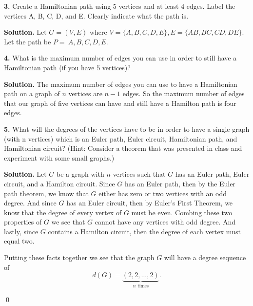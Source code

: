 \documentclass{article}
\begin{document}
\newpage
\textbf{3.}  Create a Hamiltonian path using 5 vertices and at least 4 edges. Label the vertices A, B, C, D, and E. Clearly indicate what the path is.

\vspace{2mm}
\textbf{Solution.} Let \(G= (V,E)\) where \( V=\{A,B,C,D,E\}, E=\{AB, BC, CD, DE\}\). Let the path be \(P= ~ A,B,C,D,E\). 
\begin{center}
\end{center}



\vspace{4mm}
\textbf{4.} What is the maximum number of edges you can use in order to still have a Hamiltonian path (if you have 5 vertices)?

\vspace{2mm}
\textbf{Solution.} The maximum number of edges you can use to have a Hamiltonian path on a graph of \(n\) vertices are \(n-1\) edges. So the maximum number of edges that our graph of five vertices can have and still have a Hamilton path is four edges. 



\vspace{4mm}
\textbf{5.} What will the degrees of the vertices have to be in order to have a single graph (with n vertices) which is an Euler path, Euler circuit, Hamiltonian path, and Hamiltonian circuit? (Hint: Consider a theorem
that was presented in class and experiment with some small graphs.)

\vspace{2mm}
\textbf{Solution.} Let \(G\) be a graph with \(n\) vertices such that \(G\) has an Euler path, Euler circuit, and a Hamilton circuit. Since \(G\) has an Euler path, then by the Euler path theorem, we know that \(G\) either has zero or two vertices with an odd degree. And since \(G\) has an Euler circuit, then by Euler's First Theorem, we know that the degree of every vertex of \(G\) must be even. Combing these two properties of \(G\) we see that \(G\) cannot have any vertices with odd degree. And lastly, since \(G\) contains a Hamilton circuit, then the degree of each vertex must equal two.  


\vspace{2mm}
Putting these facts together we see that the graph \(G\) will have a degree sequence of
\[
 d(G) =\underbrace{(2,2, \ldots, 2)}_{\text{\(n\) times}}.
\]
\begin{flushright}
\qed
\end{flushright}
\end{document}
